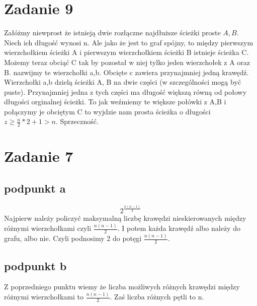 \documentclass{article}
\begin{document}
\section*{Zadanie 9}
Załóżmy niewprost że istnieją dwie rozłączne najdłuższe ścieżki proste $A, B$. Niech ich długość wynosi n. Ale jako że jest to graf spójny, to między pierwszym wierzchołkiem ścieżki A i pierwszym wierzchołkiem ścieżki B istnieje ścieżka C. Możemy teraz obciąć C tak by pozostał w niej tylko jeden wierzchołek z A oraz B. nazwijmy te wierzchołki a,b. Obcięte c zawiera przynajmniej jedną krawędź. Wierzchołki a,b dzielą ścieżki A, B na dwie części (w szczególności mogą być puste). Przynajmniej jedna z tych części ma długość większą równą od połowy długości orginalnej ścieżki. To jak weźmiemy te większe połówki z A,B i połączymy je obciętym C to wyjdzie nam prosta ścieżka o długości $z \geq \frac{n}{2} * 2 + 1 > n$. Sprzeczność.

\section*{Zadanie 7}
\subsection*{podpunkt a}
\[
  2^{\frac{n(n-1)}{2}}
\]
Najpierw należy policzyć maksymalną liczbę krawędzi nieskierowanych między różnymi wierzchołkami czyli $\frac{n(n-1)}{2}$. I potem każda krawędź albo należy do grafu, albo nie. Czyli podnosimy 2 do potęgi $\frac{n(n-1)}{2}$.
\subsection*{podpunkt b}
Z poprzedniego punktu wiemy że liczba możliwych różnych krawędzi między różnymi wierzchołkami to $\frac{n(n-1)}{2}$. Zaś liczba różnych pętli to n. 
\end{document}
